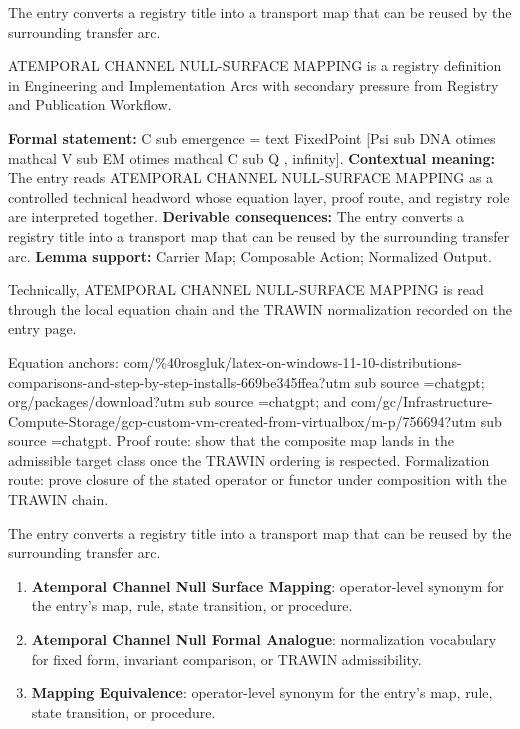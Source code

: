 The entry converts a registry title into a transport map that can be reused by the surrounding transfer arc.
\clearpage


\begingroup\small
{}
ATEMPORAL CHANNEL NULL-SURFACE MAPPING is a registry definition in Engineering and Implementation Arcs with secondary pressure from Registry and Publication Workflow.

\begingroup\footnotesize\setlength{\emergencystretch}{3em}\sloppy
\textbf{Formal statement:} C sub emergence = text FixedPoint [Psi sub DNA otimes mathcal V sub EM otimes mathcal C sub Q , infinity]. \textbf{Contextual meaning:} The entry reads ATEMPORAL CHANNEL NULL-SURFACE MAPPING as a controlled technical headword whose equation layer, proof route, and registry role are interpreted together. \textbf{Derivable consequences:} The entry converts a registry title into a transport map that can be reused by the surrounding transfer arc. \textbf{Lemma support:} Carrier Map; Composable Action; Normalized Output.\par
\endgroup

Technically, ATEMPORAL CHANNEL NULL-SURFACE MAPPING is read through the local equation chain and the TRAWIN normalization recorded on the entry page.

Equation anchors: com/\%40rosgluk/latex-on-windows-11-10-distributions-comparisons-and-step-by-step-installs-669be345ffea?utm sub source =chatgpt; org/packages/download?utm sub source =chatgpt; and com/gc/Infrastructure-Compute-Storage/gcp-custom-vm-created-from-virtualbox/m-p/756694?utm sub source =chatgpt. Proof route: show that the composite map lands in the admissible target class once the TRAWIN ordering is respected. Formalization route: prove closure of the stated operator or functor under composition with the TRAWIN chain.

The entry converts a registry title into a transport map that can be reused by the surrounding transfer arc.
\endgroup

\begin{enumerate}[leftmargin=1.6em,itemsep=6pt,topsep=4pt]
\item \textbf{Atemporal Channel Null Surface Mapping}: operator-level synonym for the entry's map, rule, state transition, or procedure.
\item \textbf{Atemporal Channel Null Formal Analogue}: normalization vocabulary for fixed form, invariant comparison, or TRAWIN admissibility.
\item \textbf{Mapping Equivalence}: operator-level synonym for the entry's map, rule, state transition, or procedure.
\end{enumerate}

